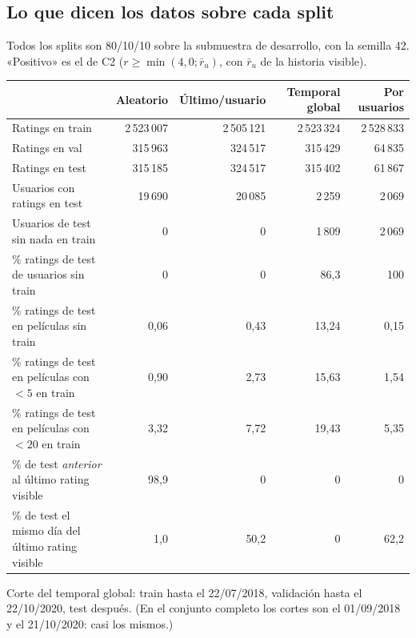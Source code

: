 \documentclass[a4paper,11pt]{article}
\begin{document}
\subsection{Lo que dicen los datos sobre cada split}
Todos los splits son 80/10/10 sobre la submuestra de desarrollo, con la semilla 42. «Positivo» es el de C2
($r\ge\min(4{,}0;\bar r_u)$, con $\bar r_u$ de la historia visible).
\begin{center}
\footnotesize
\begin{tabular}{lrrrr}
\toprule
 & Aleatorio & Último/usuario & Temporal global & Por usuarios \\
\midrule
Ratings en train & 2\,523\,007 & 2\,505\,121 & 2\,523\,324 & 2\,528\,833 \\
Ratings en val & 315\,963 & 324\,517 & 315\,429 & 64\,835 \\
Ratings en test & 315\,185 & 324\,517 & 315\,402 & 61\,867 \\
Usuarios con ratings en test & 19\,690 & 20\,085 & 2\,259 & 2\,069 \\
\addlinespace
Usuarios de test sin nada en train & 0 & 0 & 1\,809 & 2\,069 \\
\% ratings de test de usuarios sin train & 0 & 0 & 86,3 & 100 \\
\% ratings de test en películas sin train & 0,06 & 0,43 & 13,24 & 0,15 \\
\% ratings de test en películas con $<5$ en train & 0,90 & 2,73 & 15,63 & 1,54 \\
\% ratings de test en películas con $<20$ en train & 3,32 & 7,72 & 19,43 & 5,35 \\
\addlinespace
\% de test \emph{anterior} al último rating visible & 98,9 & 0 & 0 & 0 \\
\% de test el mismo día del último rating visible & 1,0 & 50,2 & 0 & 62,2 \\
\bottomrule
\end{tabular}
\end{center}
Corte del temporal global: train hasta el 22/07/2018, validación hasta el 22/10/2020, test después. (En el conjunto
completo los cortes son el 01/09/2018 y el 21/10/2020: casi los mismos.)

\begin{center}
\end{center}
\end{document}
